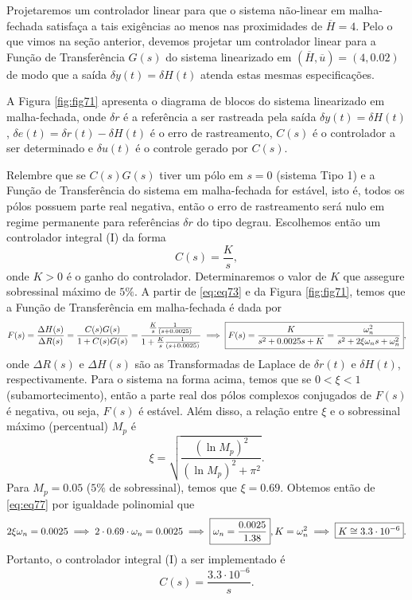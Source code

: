 \documentclass[
]{book}
\theoremstyle{definition}
\theoremstyle{definition}
\theoremstyle{definition}
\theoremstyle{remark}
\begin{document}
Projetaremos um controlador linear para que o sistema não-linear em malha-fechada satisfaça a tais exigências ao menos nas proximidades de \(\overline{H} = 4\). Pelo o que vimos na seção anterior, devemos projetar um controlador linear para a Função de Transferência \(G(s)\) do sistema linearizado em \((\overline{H}, \overline{u}) = (4, 0.02)\) de modo que a saída \(\delta y(t) = \delta H(t)\) atenda estas mesmas especificações.

A Figura \ref{fig:fig71} apresenta o diagrama de blocos do sistema linearizado em malha-fechada, onde \(\delta r\) é a referência a ser rastreada pela saída \(\delta y(t) = \delta H(t)\), \(\delta e(t) = \delta r(t) - \delta H(t)\) é o erro de rastreamento, \(C(s)\) é o controlador a ser determinado e \(\delta u(t)\) é o controle gerado por \(C(s)\).

Relembre que se \(C(s)G(s)\) tiver um pólo em \(s=0\) (sistema Tipo 1) e a Função de Transferência do sistema em malha-fechada for estável, isto é, todos os pólos possuem parte real negativa, então o erro de rastreamento será nulo em regime permanente para referências \(\delta r\) do tipo degrau. Escolhemos então um controlador integral (I) da forma
\[
C(s) = \frac{K}{s},
\]
onde \(K > 0\) é o ganho do controlador. Determinaremos o valor de \(K\) que assegure sobressinal máximo de \(5\%\). A partir de \eqref{eq:eq73} e da Figura \ref{fig:fig71}, temos que a Função de Transferência em malha-fechada é dada por
\[
F(s) = \frac{\Delta H(s)}{\Delta R(s)} = \frac{C(s)G(s)}{1 + C(s)G(s)} = \frac{\frac{K}{s}\frac{1}{(s+0.0025)}}{1 + \frac{K}{s}\frac{1}{(s+0.0025)}} \\
\implies \boxed{F(s) = \frac{K}{s^2+0.0025s+K}=\frac{\omega^2_n}{s^2 + 2\xi\omega_ns+\omega_n^2}}, \label{eq:eq77}
\]
onde \(\Delta R(s)\) e \(\Delta H(s)\) são as Transformadas de Laplace de \(\delta r(t)\) e \(\delta H(t)\), respectivamente. Para o sistema na forma acima, temos que se \(0 < \xi < 1\) (subamortecimento), então a parte real dos pólos complexos conjugados de \(F(s)\) é negativa, ou seja, \(F(s)\) é estável. Além disso, a relação entre \(\xi\) e o sobressinal máximo (percentual) \(M_p\) é
\[
\boxed{\xi = \sqrt{\frac{(\ln{M_p})^2}{(\ln{M_p})^2+\pi^2}}}.
\]
Para \(M_p = 0.05\) (\(5\%\) de sobressinal), temos que \(\xi = 0.69\). Obtemos então de \eqref{eq:eq77} por igualdade polinomial que
\[
2\xi\omega_n = 0.0025 \implies 2\cdot 0.69 \cdot \omega_n = 0.0025 \implies\boxed{\omega_n = \frac{0.0025}{1.38}}, \\
K = \omega_n^2 \implies \boxed{K \cong 3.3 \cdot 10^{-6}}.
\]
Portanto, o controlador integral (I) a ser implementado é
\[
C(s) = \boxed{\frac{3.3\cdot 10^{-6}}{s}}. \label{eq:eq78}
\]
\end{document}
